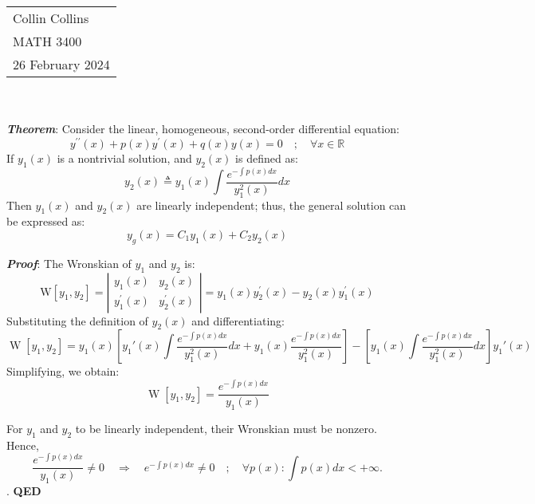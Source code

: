 \documentclass[a4paper,12pt]{article}
\begin{document}

\thispagestyle{empty}

\begin{tabular}{p{15.5cm}}
\\ Collin Collins \\
MATH 3400\\
26 February 2024 \\
\hline

\end{tabular}
\\
\\

\textbf{\textit{Theorem}}: Consider the linear, homogeneous, second-order differential equation:
$$
y^{\prime \prime}(x)+p(x) y^{\prime}(x)+q(x) y(x)=0\quad;\quad\forall x\in \mathbb{R}
$$
If $y_1(x)$ is a nontrivial solution, and $y_2(x)$ is defined as:
$$
y_2(x) \triangleq y_1(x) \int \frac{e^{-\int p(x) d x}}{y_1^2(x)} d x
$$
Then $y_1(x)$ and $y_2(x)$ are linearly independent; thus, the general solution can be expressed as:
$$
y_g(x)=C_1 y_1(x)+C_2 y_2(x)
$$

\textbf{\textit{Proof}}: The Wronskian of $y_1$ and $y_2$ is:
$$
\mathrm{W}\left[y_1, y_2\right]=\left|\begin{array}{ll}
y_1(x) & y_2(x) \\
y_1^{\prime}(x) & y_2^{\prime}(x)
\end{array}\right|=y_1(x) y_2^{\prime}(x)-y_2(x) y_1^{\prime}(x)
$$
Substituting the definition of $y_2(x)$ and differentiating:
$$ \operatorname{W}[y_1, y_2] = y_1(x)\left[y_1'(x)\int{\frac{e^{-\int p(x)dx}}{y_1^2(x)}}dx + y_1(x)\frac{e^{-\int p(x)dx}}{y_1^2(x)}\right] - \left[y_1(x)\int{\frac{e^{-\int p(x)dx}}{y_1^2(x)}}dx\right]y_1'(x)$$
Simplifying, we obtain:
$$ \operatorname{W}[y_1, y_2] = \frac{e^{-\int p(x)dx}}{y_1(x)}$$

For $y_1$ and $y_2$ to be linearly independent, their Wronskian must be nonzero. Hence,
$$
\frac{e^{-\int p(x) d x}}{y_1(x)} \neq 0 \quad \Longrightarrow \quad e^{-\int p(x) d x} \neq 0\quad;\quad\forall p(x): \int p(x) d x<+\infty.
$$.
\textbf{QED}
\end{document}
